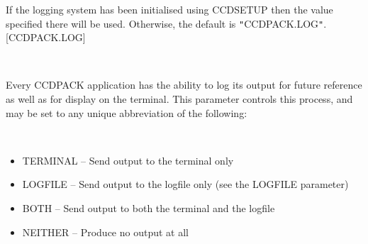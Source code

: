 \documentclass[twoside,11pt]{article}
\newcommand{\htmlref}[2]{#1}
\renewcommand{\_}{\texttt{\symbol{95}}}
\newcommand{\qt}[1]{{\tt "}#1{\tt "}}
\newcommand{\xroutine}[1]{\htmlref{{\sc #1}}{#1}}
\newcommand{\sstsubsection}[1]{ \item[{#1}] \mbox{} \\}
\newcommand{\sstitemlist}[1]{
  \mbox{} \\
  \vspace{-3.5ex}
  \begin{itemize}
     #1
  \end{itemize}
}
\newcommand{\sstitem}{\item}
\newcommand{\sstsubsection}[1]{\item[{#1}]}
\newcommand{\sstitemlist}[1]{
      \begin{itemize}
         #1
      \end{itemize}
      \\
   }
\newcommand{\sstitem}{\item}
\begin{document}
{{{         If the logging system has been initialised using \xroutine{CCDSETUP}
         then the value specified there will be used. Otherwise, the
         default is \qt{CCDPACK.LOG}.
         [CCDPACK.LOG]
      }
      \sstsubsection{
         LOGTO = LITERAL (Read)
      }{
         Every CCDPACK application has the ability to log its output
         for future reference as well as for display on the terminal.
         This parameter controls this process, and may be set to any
         unique abbreviation of the following:
         \sstitemlist{

            \sstitem
               TERMINAL  -- Send output to the terminal only

            \sstitem
               LOGFILE   -- Send output to the logfile only (see the
                               LOGFILE parameter)

            \sstitem
               BOTH      -- Send output to both the terminal and the
                               logfile

            \sstitem
               NEITHER   -- Produce no output at all

}}}}
\end{document}

